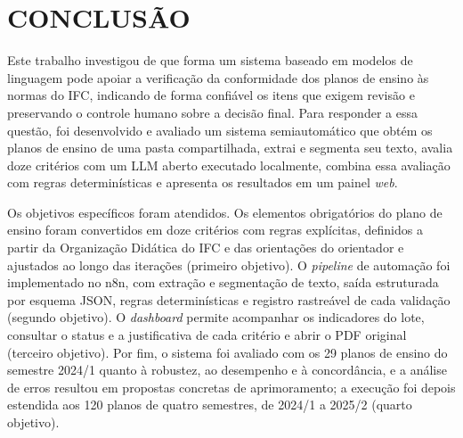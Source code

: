 \chapter{CONCLUSÃO}
\label{cap:conclusao}

Este trabalho investigou de que forma um sistema baseado em modelos de linguagem pode apoiar a verificação da conformidade dos planos de ensino às normas do IFC, indicando de forma confiável os itens que exigem revisão e preservando o controle humano sobre a decisão final. Para responder a essa questão, foi desenvolvido e avaliado um sistema semiautomático que obtém os planos de ensino de uma pasta compartilhada, extrai e segmenta seu texto, avalia doze critérios com um LLM aberto executado localmente, combina essa avaliação com regras determinísticas e apresenta os resultados em um painel \textit{web}.

Os objetivos específicos foram atendidos. Os elementos obrigatórios do plano de ensino foram convertidos em doze critérios com regras explícitas, definidos a partir da Organização Didática do IFC e das orientações do orientador e ajustados ao longo das iterações (primeiro objetivo). O \textit{pipeline} de automação foi implementado no n8n, com extração e segmentação de texto, saída estruturada por esquema JSON, regras determinísticas e registro rastreável de cada validação (segundo objetivo). O \textit{dashboard} permite acompanhar os indicadores do lote, consultar o status e a justificativa de cada critério e abrir o PDF original (terceiro objetivo). Por fim, o sistema foi avaliado com os 29 planos de ensino do semestre 2024/1 quanto à robustez, ao desempenho e à concordância, e a análise de erros resultou em propostas concretas de aprimoramento; a execução foi depois estendida aos 120 planos de quatro semestres, de 2024/1 a 2025/2 (quarto objetivo).

